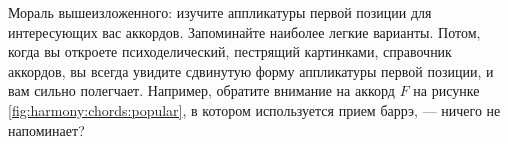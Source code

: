 Мораль вышеизложенного: изучите аппликатуры первой позиции для интересующих вас аккордов. Запоминайте наиболее легкие варианты. Потом, когда вы откроете психоделический, пестрящий картинками, справочник аккордов, вы всегда увидите сдвинутую форму аппликатуры первой позиции, и вам сильно полегчает. Например, обратите внимание на аккорд $F$ на рисунке \ref{fig:harmony:chords:popular}, в котором используется прием баррэ, --- ничего не напоминает?
